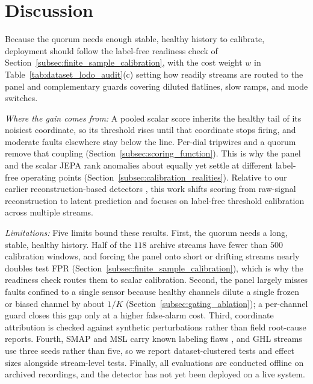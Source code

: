\vspace{-4pt}
\section{Discussion}
\label{sec:discussion}
Because the quorum needs enough stable, healthy history to calibrate, deployment should follow the label-free readiness check of Section~\ref{subsec:finite_sample_calibration}, with the cost weight $w$ in Table~\ref{tab:dataset_lodo_audit}(c) setting how readily streams are routed to the panel and complementary guards covering diluted flatlines, slow ramps, and mode switches.

\noindent\emph{Where the gain comes from:} A pooled scalar score inherits the healthy tail of its noisiest coordinate, so its threshold rises until that coordinate stops firing, and moderate faults elsewhere stay below the line. Per-dial tripwires and a quorum remove that coupling (Section~\ref{subsec:scoring_function}). This is why the panel and the scalar JEPA rank anomalies about equally yet settle at different label-free operating points (Section~\ref{subsec:calibration_realities}). Relative to our earlier reconstruction-based detectors \cite{akbarian2023aelstm, akbarian2024aekmeans}, this work shifts scoring from raw-signal reconstruction to latent prediction and focuses on label-free threshold calibration across multiple streams.

\noindent\emph{Limitations:} Five limits bound these results. First, the quorum needs a long, stable, healthy history. Half of the $118$ archive streams have fewer than $500$ calibration windows, and forcing the panel onto short or drifting streams nearly doubles test FPR (Section~\ref{subsec:finite_sample_calibration}), which is why the readiness check routes them to scalar calibration. Second, the panel largely misses faults confined to a single sensor because healthy channels dilute a single frozen or biased channel by about $1/K$ (Section~\ref{subsec:gating_ablation}); a per-channel guard closes this gap only at a higher false-alarm cost. Third, coordinate attribution is checked against synthetic perturbations rather than field root-cause reports. Fourth, SMAP and MSL carry known labeling flaws \cite{wu2023flawed}, and GHL streams use three seeds rather than five, so we report dataset-clustered tests and effect sizes alongside stream-level tests. Finally, all evaluations are conducted offline on archived recordings, and the detector has not yet been deployed on a live system.

